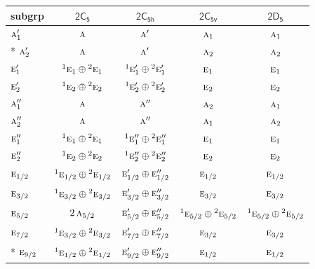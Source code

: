 \documentclass[10pt,a4paper]{article}
\numberwithin{equation}{section}
\newcommand{\grp}[1]{\mathsf{#1}}
\newcommand{\irr}[1]{\text{\normalfont\scshape #1}}
\newcommand{\conjpair}[1]{{}^{#1}}
\begin{document}
{\small\begin{longtable}{@{}lcccc@{}}\toprule
subgrp & \href{2C5.pdf}{$\grp{2C_{5}}$} & \href{2C5h.pdf}{$\grp{2C_{5h}}$} & \href{2C5v.pdf}{$\grp{2C_{5v}}$} & \href{2D5.pdf}{$\grp{2D_{5}}$}\\\midrule\endhead
\bottomrule\endfoot\endlastfoot
$\irr{a}_{1}'$ & $\irr{a}$ & $\irr{a}'$ & $\irr{a}_{1}$ & $\irr{a}_{1}$\\*
$\irr{a}_{2}'$ & $\irr{a}$ & $\irr{a}'$ & $\irr{a}_{2}$ & $\irr{a}_{2}$\\
$\irr{e}_{1}'$ & $\conjpair{1}\irr{e}_{1}\oplus \conjpair{2}\irr{e}_{1}$ & $\conjpair{1}\irr{e}_{1}'\oplus \conjpair{2}\irr{e}_{1}'$ & $\irr{e}_{1}$ & $\irr{e}_{1}$\\
$\irr{e}_{2}'$ & $\conjpair{1}\irr{e}_{2}\oplus \conjpair{2}\irr{e}_{2}$ & $\conjpair{1}\irr{e}_{2}'\oplus \conjpair{2}\irr{e}_{2}'$ & $\irr{e}_{2}$ & $\irr{e}_{2}$\\
$\irr{a}_{1}''$ & $\irr{a}$ & $\irr{a}''$ & $\irr{a}_{2}$ & $\irr{a}_{1}$\\
$\irr{a}_{2}''$ & $\irr{a}$ & $\irr{a}''$ & $\irr{a}_{1}$ & $\irr{a}_{2}$\\
$\irr{e}_{1}''$ & $\conjpair{1}\irr{e}_{1}\oplus \conjpair{2}\irr{e}_{1}$ & $\conjpair{1}\irr{e}_{1}''\oplus \conjpair{2}\irr{e}_{1}''$ & $\irr{e}_{1}$ & $\irr{e}_{1}$\\
$\irr{e}_{2}''$ & $\conjpair{1}\irr{e}_{2}\oplus \conjpair{2}\irr{e}_{2}$ & $\conjpair{1}\irr{e}_{2}''\oplus \conjpair{2}\irr{e}_{2}''$ & $\irr{e}_{2}$ & $\irr{e}_{2}$\\
$\irr{e}_{1/2}$ & $\conjpair{1}\irr{e}_{1/2}\oplus \conjpair{2}\irr{e}_{1/2}$ & $\irr{e}_{1/2}'\oplus \irr{e}_{1/2}''$ & $\irr{e}_{1/2}$ & $\irr{e}_{1/2}$\\
$\irr{e}_{3/2}$ & $\conjpair{1}\irr{e}_{3/2}\oplus \conjpair{2}\irr{e}_{3/2}$ & $\irr{e}_{3/2}'\oplus \irr{e}_{3/2}''$ & $\irr{e}_{3/2}$ & $\irr{e}_{3/2}$\\
$\irr{e}_{5/2}$ & $2\,\irr{a}_{5/2}$ & $\irr{e}_{5/2}'\oplus \irr{e}_{5/2}''$ & $\conjpair{1}\irr{e}_{5/2}\oplus \conjpair{2}\irr{e}_{5/2}$ & $\conjpair{1}\irr{e}_{5/2}\oplus \conjpair{2}\irr{e}_{5/2}$\\
$\irr{e}_{7/2}$ & $\conjpair{1}\irr{e}_{3/2}\oplus \conjpair{2}\irr{e}_{3/2}$ & $\irr{e}_{7/2}'\oplus \irr{e}_{7/2}''$ & $\irr{e}_{3/2}$ & $\irr{e}_{3/2}$\\*
$\irr{e}_{9/2}$ & $\conjpair{1}\irr{e}_{1/2}\oplus \conjpair{2}\irr{e}_{1/2}$ & $\irr{e}_{9/2}'\oplus \irr{e}_{9/2}''$ & $\irr{e}_{1/2}$ & $\irr{e}_{1/2}$\\
\bottomrule\end{longtable}}
\end{document}
